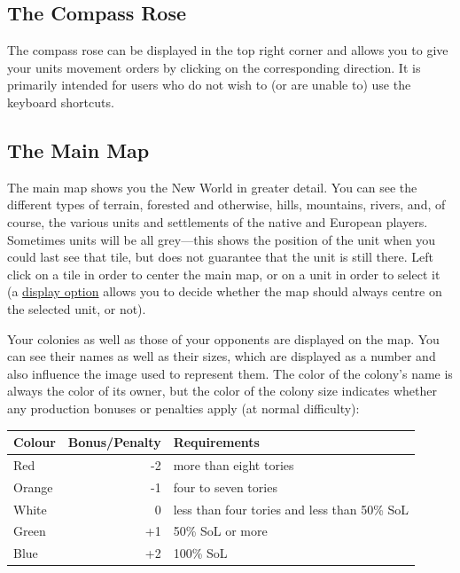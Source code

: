 \documentclass[12pt]{book}
\begin{document}
\hypertarget{compass rose}{\subsection{The Compass Rose}}

The compass rose can be displayed in the top right corner and allows
you to give your units movement orders by clicking on the corresponding
direction. It is primarily intended for users who do not wish to (or
are unable to) use the keyboard shortcuts.


\hypertarget{main map}{\subsection{The Main Map}}

The main map shows you the New World in greater detail. You can see
the different types of terrain, forested and otherwise, hills,
mountains, rivers, and, of course, the various units and settlements
of the native and European players.  Sometimes units will be all
grey---this shows the position of the unit when you could last see
that tile, but does not guarantee that the unit is still there.  Left
click on a tile in order to center the main map, or on a unit in order
to select it (a \hyperlink{display options}{display option} allows you
to decide whether the map should always centre on the selected unit,
or not).

Your colonies as well as those of your opponents are displayed on the
map. You can see their names as well as their sizes, which are
displayed as a number and also influence the image used to represent
them. The color of the colony's name is always the color of its owner,
but the color of the colony size indicates whether any production
bonuses or penalties apply (at normal difficulty):

\vskip5mm

\begin{tabular}{l r l}
Colour&Bonus/Penalty&Requirements\\
\hline
Red    & -2 & more than eight tories\\
Orange & -1 & four to seven tories\\
White  &  0 & less than four tories and less than 50\% SoL\\
Green  & +1 & 50\% SoL or more\\
Blue   & +2 & 100\% SoL\\
\end{tabular}

\vskip5mm
\end{document}
